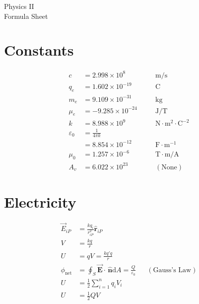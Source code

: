 \documentclass[10pt]{article}
\newcommand{\scinot}[2]{\ensuremath{#1 \times 10^{#2}}}
\newcommand{\id}[1]{\mathrm{d} #1}
\newcommand{\bvec}[1]{\vec{\mathbf{#1}}}
\newcommand{\buvec}[1]{\hat{\mathbf{#1}}}
\begin{document}
\raggedleft
\footnotesize
\begin{multicols*}{5}

\setlength{\premulticols}{1pt}
\setlength{\postmulticols}{1pt}
\setlength{\multicolsep}{1pt}
\setlength{\columnsep}{2pt}

\begin{center}
    \Large
    Physics \textrm{II} \\
    Formula Sheet
\end{center}

\section{Constants}

\begin{alignat*}{2}
    c   &= \scinot{2.998}{8}   && \quad \mathrm{m / s}\\
    q_e &= \scinot{1.602}{-19} && \quad \mathrm{C}\\
    m_e &= \scinot{9.109}{-31} && \quad \mathrm{kg}\\
    \mu_e &= \scinot{-9.285}{-24} && \quad \mathrm{J/T}\\
    k   &= \scinot{8.988}{9}   && \quad \mathrm{N \cdot m^2 \cdot
    C^{-2}}\\
    \varepsilon_0 &= \frac{1}{4\pi k} \\
        &= \scinot{8.854}{-12} && \quad \mathrm{F \cdot m^{-1}}\\
	\mu_0 &= \scinot{1.257}{-6} && \quad \mathrm{T \cdot m/A}\\
    A_v &= \scinot{6.022}{23} && \quad (\text{None})
\end{alignat*}

\section{Electricity}

\begin{align*}
    \vec{E}_{iP} &= \frac{kq_i}{r_{iP}^2} \hat{\mathbf{r}}_{iP}\\
    V &= \frac{kq}{r}\\
    U &= qV = \frac{kq'q}{r}\\
    \phi_\text{net} &= \oint_S \bvec{E} \cdot \, \buvec{n} \id{A} =
    \frac{Q}{\varepsilon_0} && (\text{Gauss's Law})\\
    U &= \frac{1}{2} \sum_{i=1}^n q_i V_i\\
    U &= \frac{1}{2} QV
\end{align*}


\end{multicols*}
\end{document}
